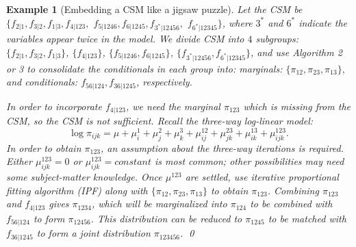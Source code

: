 \documentclass[12pt,a4paper]{article}
\newtheorem{example}{Example}
\begin{document}
\begin{example}[Embedding a CSM  like a jigsaw puzzle]\label{ex:4}\rm
 Let the CSM be $\{f_{2|1}, f_{3|2}, f_{1|3}, f_{4|123},$ $ f_{5|1246}, f_{6|1245}, f_{3^*|12456},$ $ f_{6^*|12345}\}$, where $3^*$ and $6^*$ indicate the variables appear twice in the model.  We divide CSM into $4$ subgroups: $\{f_{2|1}, f_{3|2}, f_{1|3} \}$, $\{ f_{4|123}\}$, $\{ f_{5|1246}, f_{6|1245}\}$, $\{ f_{3^*|12456}, f_{6^*|12345}\}$, and use Algorithm 2 or 3 to consolidate the conditionals in each group into: marginals: $\{\pi_{12}, \pi_{23}, \pi_{13}\},$ and conditionals: $f_{56|124}, f_{36|1245}$, respectively.

 In order to incorporate $f_{4|123}$, we need the marginal $\pi_{123}$ which is missing from the CSM, so the CSM is not sufficient.    Recall the three-way log-linear model:
 \[
 \log \pi_{ijk}= \mu +\mu^1_i + \mu^2_j+ \mu^3_k + \mu^{12}_{ij}+ \mu^{23}_{jk}+\mu^{13}_{ik}+ \mu^{123}_{ijk}.
 \]
 In order to obtain $\pi_{123}$, an assumption about the three-way iterations is required.  Either $\mu^{123}_{ijk}= 0$ or $\mu^{123}_{ijk}= constant$ is most common;   other possibilities may need some subject-matter knowledge.  Once $\mu^{123}$ are settled, use iterative proportional fitting algorithm (IPF) along with $\{\pi_{12}, \pi_{23}, \pi_{13}\}$ to obtain $\pi_{123}$. %
 Combining $\pi_{123}$ and $f_{4|123}$ gives $\pi_{1234}$, which will be marginalized into $\pi_{124}$ to be combined with $f_{56|124}$ to form $\pi_{12456}$.  This  distribution can be reduced to $\pi_{1245}$ to be matched with $f_{36|1245}$ to form a joint distribution $\pi_{123456}$.  %
\qed
\end{example}
\end{document}
